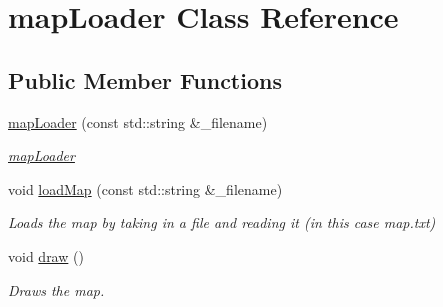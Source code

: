 \hypertarget{classmapLoader}{\section{map\-Loader Class Reference}
\label{classmapLoader}
}
\subsection*{Public Member Functions}
\begin{DoxyCompactItemize}
\item 
\hyperlink{classmapLoader_ad2a9867e6b3b040820048c1dba771cc7}{map\-Loader} (const std\-::string \&\-\_\-filename)
\begin{DoxyCompactList}\small\item\em \hyperlink{classmapLoader}{map\-Loader} \end{DoxyCompactList}\item 
\hypertarget{classmapLoader_a84d3e78c823100c1fe13a96362404426}{void \hyperlink{classmapLoader_a84d3e78c823100c1fe13a96362404426}{load\-Map} (const std\-::string \&\-\_\-filename)}\label{classmapLoader_a84d3e78c823100c1fe13a96362404426}

\begin{DoxyCompactList}\small\item\em Loads the map by taking in a file and reading it (in this case map.\-txt) \end{DoxyCompactList}\item 
\hypertarget{classmapLoader_a2be9db6c6c38d137e094fa3111e9a982}{void \hyperlink{classmapLoader_a2be9db6c6c38d137e094fa3111e9a982}{draw} ()}\label{classmapLoader_a2be9db6c6c38d137e094fa3111e9a982}

\begin{DoxyCompactList}\small\item\em Draws the map. \end{DoxyCompactList}\end{DoxyCompactItemize}
